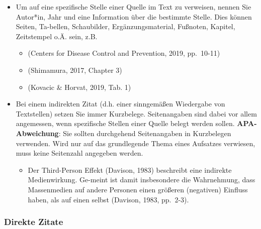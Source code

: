 \documentclass[
  letterpaper,
  DIV=11]{scrreprt}
\providecommand{\tightlist}{%
  \setlength{\itemsep}{0pt}\setlength{\parskip}{0pt}}\usepackage{longtable,booktabs,array}
\begin{document}
\begin{itemize}
\item
  Um auf eine spezifische Stelle einer Quelle im Text zu verweisen,
  nennen Sie Autor*in, Jahr und eine Information über die bestimmte
  Stelle. Dies können Seiten, Ta-bellen, Schaubilder,
  Ergänzungsmaterial, Fußnoten, Kapitel, Zeitstempel o.Ä. sein, z.B.

  \begin{itemize}
  \item
    (Centers for Disease Control and Prevention, 2019, pp.~10-11)
  \item
    (Shimamura, 2017, Chapter 3)
  \item
    (Kovacic \& Horvat, 2019, Tab. 1)
  \end{itemize}
\item
  Bei einem indirekten Zitat (d.h. einer sinngemäßen Wiedergabe von
  Textstellen) setzen Sie immer Kurzbelege. Seitenangaben sind dabei vor
  allem angemessen, wenn spezifische Stellen einer Quelle belegt werden
  sollen. \textbf{APA-Abweichung}: Sie sollten durchgehend Seitenangaben
  in Kurzbelegen verwenden. Wird nur auf das grundlegende Thema eines
  Aufsatzes verwiesen, muss keine Seitenzahl angegeben werden.

  \begin{itemize}
  \tightlist
  \item
    Der Third-Person Effekt (Davison, 1983) beschreibt eine indirekte
    Medienwirkung. Ge-meint ist damit insbesondere die Wahrnehmung, dass
    Massenmedien auf andere Personen einen größeren (negativen) Einfluss
    haben, als auf einen selbst (Davison, 1983, pp.~2-3).
  \end{itemize}
\end{itemize}

\hypertarget{direkte-zitate}{%
\subsubsection{Direkte Zitate}\label{direkte-zitate}}
\end{document}
